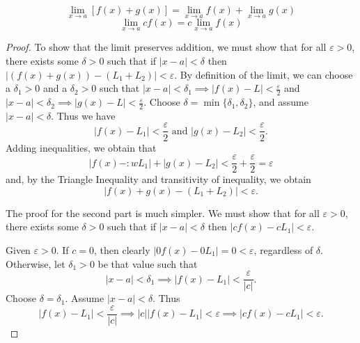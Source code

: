 \documentclass{article}
\begin{document}
\begin{theorem}
$$\lim_{x \to a} [f(x) + g(x)] = \lim_{x \to a} f(x) + \lim_{x \to a} g(x)$$ 
$$\lim_{x \to a} c f(x) = c \lim_{x \to a} f(x)$$
\end{theorem}
\begin{proof}
To show that the limit preserves addition, we must show that for all $\varepsilon > 0$, there exists some $\delta > 0$ such that if $|x - a| < \delta$ then $|(f(x) + g(x)) - (L_1 + L_2)| < \varepsilon$.
By definition of the limit, we can choose a $\delta_1 > 0$ and a $\delta_2 > 0$ such that $|x - a| < \delta_1 \implies |f(x) - L| < \frac{\varepsilon}{2}$ and $|x - a| < \delta_2 \implies |g(x) - L| < \frac{\varepsilon}{2}$. Choose $\delta = \min{\{\delta_1, \delta_2\}}$, and assume $|x - a| < \delta$. Thus we have
\[
|f(x) - L_1| < \frac{\varepsilon}{2} \text{ and } |g(x) - L_2| < \frac{\varepsilon}{2}.
\]
Adding inequalities, we obtain that 
\[
|f(x) - :wL_1| + |g(x) - L_2| < \frac{\varepsilon}{2} + \frac{\varepsilon}{2} = \varepsilon
\]
and, by the Triangle Inequality and transitivity of inequality, we obtain
\[
|f(x) + g(x) - (L_1 + L_2)| < \varepsilon
.\]


The proof for the second part is much simpler. We must show that for all $\varepsilon > 0$, there exists some $\delta > 0$ such that if $|x - a| < \delta$ then $|cf(x) - cL_1| < \varepsilon$.


Given $\varepsilon > 0$. If $c = 0$, then clearly $|0f(x) - 0L_1| = 0 < \varepsilon$, regardless of $\delta$. Otherwise, let $\delta_1 > 0$ be that value such that 
$$|x - a| < \delta_1 \implies |f(x) - L_1| < \frac{\varepsilon}{|c|}.$$ 
Choose $\delta = \delta_1$. Assume $|x - a| < \delta $. Thus $$|f(x) - L_1| < \frac{\varepsilon}{|c|} \implies |c||f(x) - L_1| < \varepsilon \implies |cf(x) - cL_1| < \varepsilon.$$
\end{proof}
\end{document}
